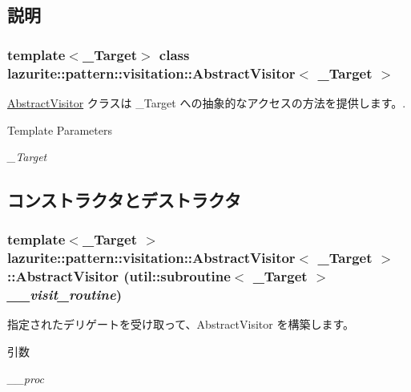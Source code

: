 \subsection{説明}
\subsubsection*{template$<$\_\-Target$>$ class lazurite::pattern::visitation::AbstractVisitor$<$ \_\-Target $>$}

\hyperlink{classlazurite_1_1pattern_1_1visitation_1_1_abstract_visitor}{AbstractVisitor} クラスは \_\-Target への抽象的なアクセスの方法を提供します。. 
\begin{DoxyTemplParams}{Template Parameters}
\item[{\em \_\-Target}]\end{DoxyTemplParams}


\subsection{コンストラクタとデストラクタ}
\hypertarget{classlazurite_1_1pattern_1_1visitation_1_1_abstract_visitor_3_01___target_01_4_a09251c5cb1f2a1b6c229643ce7961a6e}{
\subsubsection[{AbstractVisitor}]{\setlength{\rightskip}{0pt plus 5cm}template$<$\_\-Target $>$ {\bf lazurite::pattern::visitation::AbstractVisitor}$<$ \_\-Target $>$::{\bf AbstractVisitor} (util::subroutine$<$ \_\-Target $>$ {\em \_\-\_\-visit\_\-routine})}}
\label{classlazurite_1_1pattern_1_1visitation_1_1_abstract_visitor_3_01___target_01_4_a09251c5cb1f2a1b6c229643ce7961a6e}


指定されたデリゲートを受け取って、AbstractVisitor を構築します。 
\begin{DoxyParams}{引数}
\item[{\em \_\-\_\-proc}]\end{DoxyParams}


